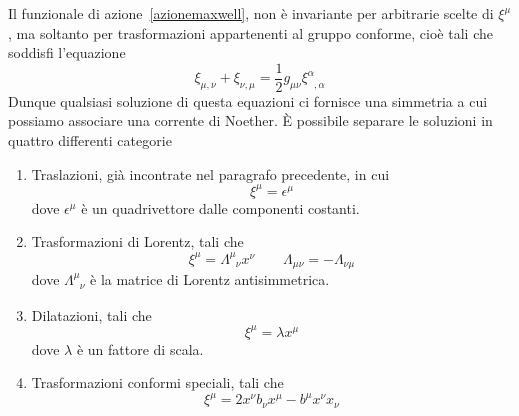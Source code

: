     Il funzionale di azione~\eqref{azionemaxwell}, non è invariante per arbitrarie scelte di $\xi^\mu$, ma soltanto per trasformazioni appartenenti al gruppo conforme, cioè tali che soddisfi l'equazione
\begin{equation}\label{conforme}
    \xi_{\mu,\nu} + \xi_{\nu,\mu} = \frac{1}{2} g_{\mu\nu} \xi^\alpha_{\phantom \alpha ,\alpha}
\end{equation} 
    Dunque qualsiasi soluzione di questa equazioni ci fornisce una simmetria a cui possiamo associare una corrente di Noether. È possibile separare le soluzioni in quattro differenti categorie 
\begin{enumerate}
    \item Traslazioni, già incontrate nel paragrafo precedente, in cui
\begin{equation*}
    \xi^\mu = \epsilon^\mu
\end{equation*}
    dove $\epsilon^\mu$ è un quadrivettore dalle componenti costanti.
    \item Trasformazioni di Lorentz, tali che 
\begin{equation*}
    \xi^\mu = \Lambda^\mu_{\phantom \mu \nu} x^\nu \qquad \Lambda_{\mu\nu} = - \Lambda_{\nu\mu}
\end{equation*}
    dove $\Lambda^\mu_{\phantom \mu \nu}$ è la matrice di Lorentz antisimmetrica.
    \item Dilatazioni, tali che
\begin{equation*}
    \xi^\mu = \lambda x^\mu
\end{equation*}
    dove $\lambda$ è un fattore di scala.
    \item Trasformazioni conformi speciali, tali che
\begin{equation*}
    \xi^\mu = 2 x^\nu b_\nu x^\mu - b^\mu x^\nu x_\nu
\end{equation*}
\end{enumerate}

